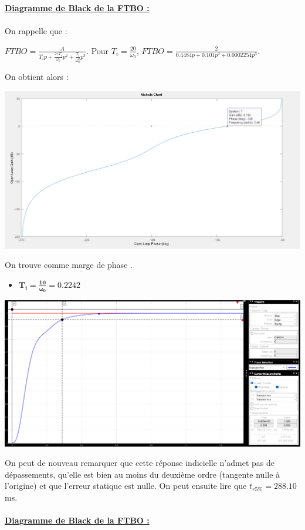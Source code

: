 \documentclass[12pt]{article}
\begin{document}
\underline{\bf Diagramme de Black de la FTBO :}
\\\\On rappelle que : 
\begin{center}
   \large $FTBO = \frac{A}{T_ip + \frac{2zT_i}{\omega_0}p^2 + \frac{T_i}{\omega_0^2}p^3}$.
    \normalsize Pour $T_i = \frac{20}{\omega_0}$, \large $FTBO = \frac{2}{0.4484p + 0.101p^2 + 0.0002254p^3}$.
\end{center}
\normalsize On obtient alors :
\begin{center}
    \includegraphics[width = 16 cm]{TP2 Simulink/Syst_2/nichols_Ti=20_sur_omega0.png}
\end{center}
On trouve comme marge de phase .
\newpage
\begin{itemize}
    \item \large $\mathbf{T_i = \frac{10}{\omega_0} = 0.2242}$
\end{itemize}
\begin{center}
    \includegraphics[width = 16 cm]{TP2 Simulink/Syst_2/tr5prct_4.2_Ti=10_sur_omega0.png}

\end{center}
On peut de nouveau remarquer que cette réponse indicielle n'admet pas de dépassements, qu'elle est bien au moins du deuxième ordre (tangente nulle à l'origine) et que l'erreur statique est nulle.
On peut ensuite lire que $t_{r5\%} = 288.10$ms.
\\\\\underline{\bf Diagramme de Black de la FTBO :}
\end{document}
